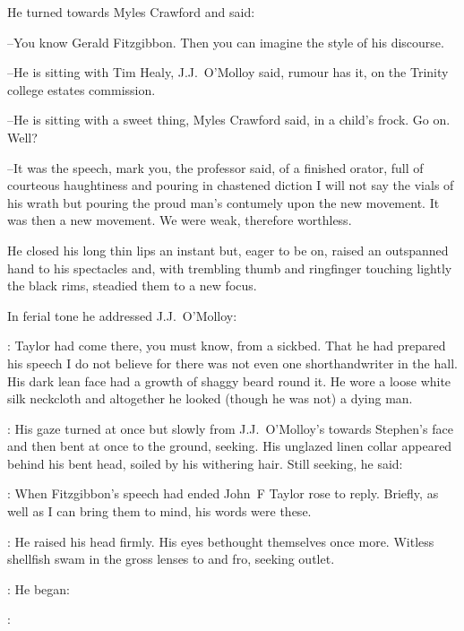 He turned towards Myles Crawford and said:

--You know Gerald Fitzgibbon.
Then you can imagine the style of his discourse.

--He is sitting with Tim Healy,
J.J.~O'Molloy said,
rumour has it,
on the Trinity college estates commission.

--He is sitting with a sweet thing,
Myles Crawford said,
in a child's frock.
Go on.
Well?

--It was the speech,
mark you,
the professor said,
of a finished orator,
full of courteous haughtiness and pouring in chastened diction
I will not say the vials of his wrath
but pouring the proud man's contumely upon the new movement.
It was then a new movement.
We were weak,
therefore worthless.

He closed his long thin lips an instant
but, eager to be on,
raised an outspanned hand to his spectacles
and, with trembling thumb and ringfinger touching lightly the black rims,
steadied them to a new focus.



In ferial tone
he addressed J.J.~O'Molloy:

\machugh:
Taylor had come there,
you must know,
from a sickbed.
That he had prepared his speech I do not believe
for there was not even one shorthandwriter in the hall.
His dark lean face had a growth of shaggy beard round it.
He wore a loose white silk neckcloth
and altogether he looked (though he was not)
a dying man.

:
His gaze turned at once but slowly from J.J.~O'Molloy's
towards Stephen's face
and then bent at once to the ground,
seeking.
His unglazed linen collar appeared behind his bent head,
soiled by his withering hair.
Still seeking,
he said:

\machugh:
When Fitzgibbon's speech had ended
John~F Taylor rose to reply.
Briefly, as well as I can bring them to mind,
his words were these.

:
He raised his head firmly.
His eyes bethought themselves once more.
Witless shellfish swam in the gross lenses to and fro,
seeking outlet.

:
He began:

\machugh:

